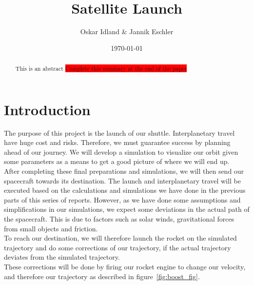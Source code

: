 \documentclass[reprint,english,notitlepage]{revtex4-2}
\begin{document}
\title{Satellite Launch}
\author{Oskar Idland \& Jannik Eschler}
\date{\today}

\begin{abstract}
    This is an abstract \colorbox{red}{Complete this summary at the end of the paper}
\end{abstract}
\maketitle

\section{Introduction} \label{sec:introduction}
The purpose of this project is the launch of our shuttle.
Interplanetary travel have huge cost and risks.
Therefore, we must guarantee success by planning ahead of our journey.
We will develop a simulation to visualize our orbit given some parameters as a means to get a good picture of where we will end up.\\

After completing these final preparations and simulations, we will then send our spacecraft towards its destination.
The launch and interplanetary travel will be executed based on the calculations and simulations we have done in the previous parts of this series of reports.
However, as we have done some assumptions and simplifications in our simulations, we expect some deviations in the actual path of the spacecraft.
This is due to factors such as solar winds, gravitational forces from small objects and friction.\\
To reach our destination, we will therefore launch the rocket on the simulated trajectory and do some corrections of our trajectory, if the actual trajectory deviates from the simulated trajectory.\\
These corrections will be done by firing our rocket engine to change our velocity, and therefore our trajectory as described in figure~\ref{fig:boost_fig}.
\end{document}
